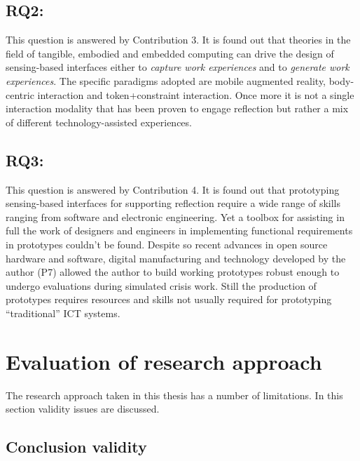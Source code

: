 \subsection{RQ2: \RQii}\label{rq2-how-sensing-based-interfaces-can-be-designed-to-trigger-reflection-via-re-creation-or-generation-of-work-experiences}

This question is answered by Contribution 3. It is found out that theories in the field of tangible, embodied and embedded computing can drive the design of sensing-based interfaces either to \emph{capture work experiences} and to \emph{generate work experiences}. The specific paradigms adopted are mobile augmented reality, body-centric interaction and token+constraint interaction. Once more it is not a single interaction modality that has been proven to engage reflection but rather a mix of different technology-assisted experiences.

\subsection{RQ3: \RQiii}\label{rq3-how-sensing-based-interfaces-for-supporting-reflection-can-be-rapidly-prototyped}

This question is answered by Contribution 4. It is found out that prototyping sensing-based interfaces for supporting reflection require a wide range of skills ranging from software and electronic engineering. Yet a toolbox for assisting in full the work of designers and engineers in implementing functional requirements in prototypes couldn't be found. Despite so recent advances in open source hardware and software, digital manufacturing and technology developed by the author (P7) allowed the author to build working prototypes robust enough to undergo evaluations during simulated crisis work. Still the production of prototypes requires resources and skills not usually required for prototyping ``traditional'' ICT systems.

\section{Evaluation of research approach}\label{evaluation-of-research-approach}

The research approach taken in this thesis has a number of limitations. In this section validity issues are discussed.

\subsection{Conclusion validity}\label{conclusion-validity}

